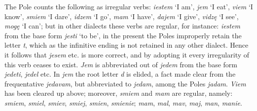 The Pole counts the following as irregular verbs: \textit{iestem} ‘I am’, \textit{jem} ‘I eat’, \textit{viem} ‘I know’, \textit{smiem} ‘I dare’, \textit{idzem} ‘I go’, \textit{mam} ‘I have’, \textit{dajem} ‘I give’, \textit{vidzę} ‘I see’, \textit{mogę} ‘I can’; but in other dialects these verbs are regular, for instance: \textit{iestem} from the base form \textit{jesti} ‘to be’, in the present the Poles improperly retain the letter \textit{t}, which as the infinitive ending is not retained in any other dialect. Hence it follows that \textit{jesem} etc. is more correct, and by adopting it every irregularity of this verb ceases to exist. \textit{Jem} is abbreviated out of \textit{jedem} from the base form \textit{jedeti}, \textit{jedel} etc. In \textit{jem} the root letter \textit{d} is elided, a fact made clear from the frequentative \textit{jedavam}, but abbreviated to \textit{jedam}, among the Poles \textit{jadam}. \textit{Viem} has been cleared up above; moreover, \textit{smiem} and \textit{mam} are regular, namely: \textit{smiem}, \textit{smiel}, \textit{smiev}, \textit{smiej}, \textit{smien}, \textit{smienie}; \textit{mam}, \textit{mal}, \textit{mav}, \textit{maj}, \textit{man}, \textit{manie}. 


